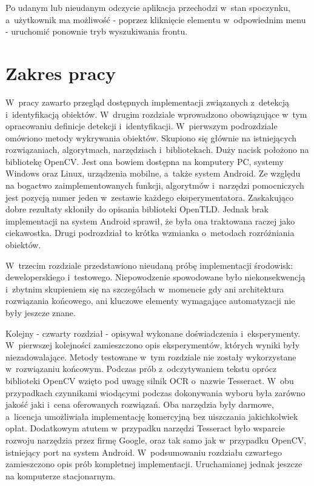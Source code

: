 Po udanym lub nieudanym odczycie aplikacja przechodzi w~stan spoczynku,
a~użytkownik ma możliwość - poprzez kliknięcie
elementu w~odpowiednim menu - uruchomić
ponownie tryb wyszukiwania frontu.

\section{Zakres pracy}

W~pracy zawarto przegląd dostępnych implementacji związanych
z~detekcją i~identyfikacją obiektów. W~drugim rozdziale 
wprowadzono obowiązujące
w~tym opracowaniu definicje detekcji i~identyfikacji. 
W~pierwszym podrozdziale omówiono metody wykrywania obiektów.
Skupiono się
głównie na istniejących rozwiązaniach, algorytmach, narzędziach 
i~bibliotekach. Duży nacisk położono na bibliotekę OpenCV. 
Jest ona bowiem dostępna na komputery PC, systemy Windows oraz Linux, 
urządzenia
mobilne, a~także system Android. Ze względu na bogactwo zaimplementowanych
funkcji, algorytmów i~narzędzi pomocniczych jest pozycją numer 
jeden w~zestawie każdego eksperymentatora. Zaskakująco dobre
rezultaty skłoniły do opisania biblioteki OpenTLD. Jednak brak
implementacji na system Android sprawił, że była ona traktowana raczej jako
ciekawostka. Drugi podrozdział to krótka wzmianka o~metodach
rozróżniania obiektów.

W~trzecim rozdziale przedstawiono nieudaną próbę implementacji
środowisk: deweloperskiego i~testowego. Niepowodzenie
spowodowane było niekonsekwencją
i~zbytnim skupieniem się na szczegółach w~momencie gdy ani
architektura rozwiązania końcowego, ani kluczowe elementy wymagające
automatyzacji nie były jeszcze znane.

Kolejny - czwarty rozdział - opisywał wykonane doświadczenia
i~eksperymenty. W~pierwszej kolejności zamieszczono opis 
eksperymentów, których wyniki były niezadowalające. Metody testowane 
w~tym rozdziale nie zostały wykorzystane w~rozwiązaniu końcowym.
Podczas prób z~odczytywaniem
tekstu oprócz biblioteki OpenCV wzięto pod uwagę silnik 
OCR o~nazwie Tesseract. W~obu przypadkach
czynnikami wiodącymi podczas dokonywania wyboru była zarówno jakość
jaki i~cena oferowanych rozwiązań. Oba narzędzia
były darmowe, a~licencja umożliwiała implementację komercyjną 
bez uiszczania
jakichkolwiek opłat. Dodatkowym atutem w~przypadku narzędzi Tesseract
było wsparcie rozwoju narzędzia przez firmę Google, oraz tak samo jak 
w~przypadku OpenCV, istniejący port na system Android.
W~podsumowaniu rozdziału czwartego zamieszczono opis prób kompletnej
implementacji. Uruchamianej jednak jeszcze na komputerze stacjonarnym.

